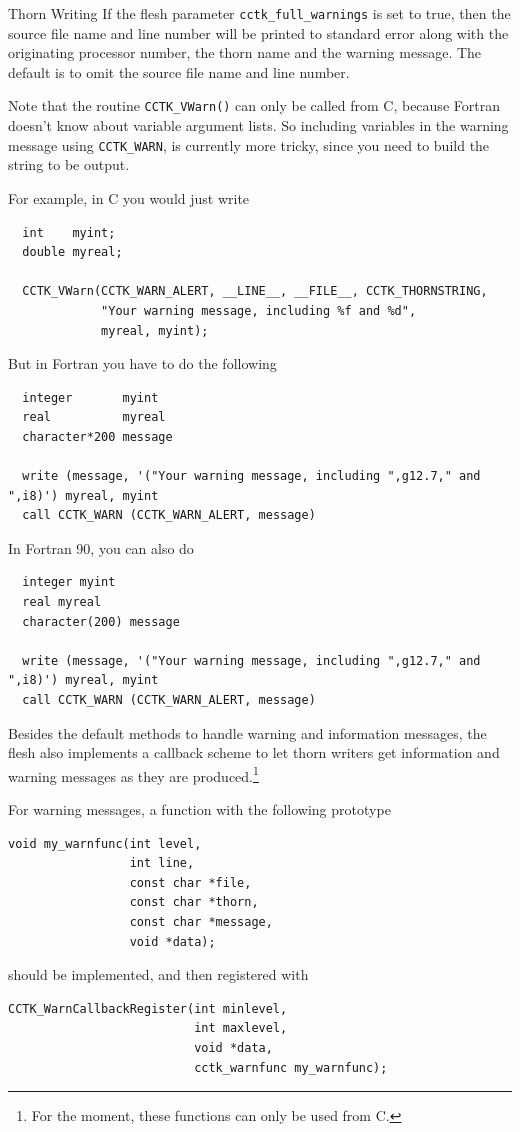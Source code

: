\begin{cactuspart}{Thorn Writing}
If the flesh parameter \texttt{cctk\_full\_warnings} is set to true, then the
source file name and line number will be printed to standard error along with
the originating processor number, the thorn name and the warning message.
The default is to omit the source file name and line number.

Note that the routine \texttt{CCTK\_VWarn()} can only be called from C, because
Fortran doesn't know about variable argument lists. So including variables in
the warning message using \texttt{CCTK\_WARN}, is currently more tricky, since
you need to build the string to be output.

For example, in C you would just write
\begin{verbatim}
  int    myint;
  double myreal;

  CCTK_VWarn(CCTK_WARN_ALERT, __LINE__, __FILE__, CCTK_THORNSTRING,
             "Your warning message, including %f and %d",
             myreal, myint);
\end{verbatim}

But in Fortran you have to do the following
\begin{verbatim}
  integer       myint
  real          myreal
  character*200 message

  write (message, '("Your warning message, including ",g12.7," and ",i8)') myreal, myint
  call CCTK_WARN (CCTK_WARN_ALERT, message)
\end{verbatim}

In Fortran 90, you can also do
\begin{verbatim}
  integer myint
  real myreal
  character(200) message

  write (message, '("Your warning message, including ",g12.7," and ",i8)') myreal, myint
  call CCTK_WARN (CCTK_WARN_ALERT, message)
\end{verbatim}

Besides the default methods to handle warning and information
messages, the flesh also implements a callback scheme to let thorn
writers get information and warning messages as they are produced.\footnote{For the moment, these
functions can only be used from C.}

For warning messages, a function with the following prototype
\begin{verbatim}
void my_warnfunc(int level,
                 int line,
                 const char *file,
                 const char *thorn,
                 const char *message,
                 void *data);
\end{verbatim}
should be implemented, and then registered with 
\begin{verbatim}
CCTK_WarnCallbackRegister(int minlevel,
                          int maxlevel,
                          void *data,
                          cctk_warnfunc my_warnfunc);
\end{verbatim}


\end{cactuspart}

